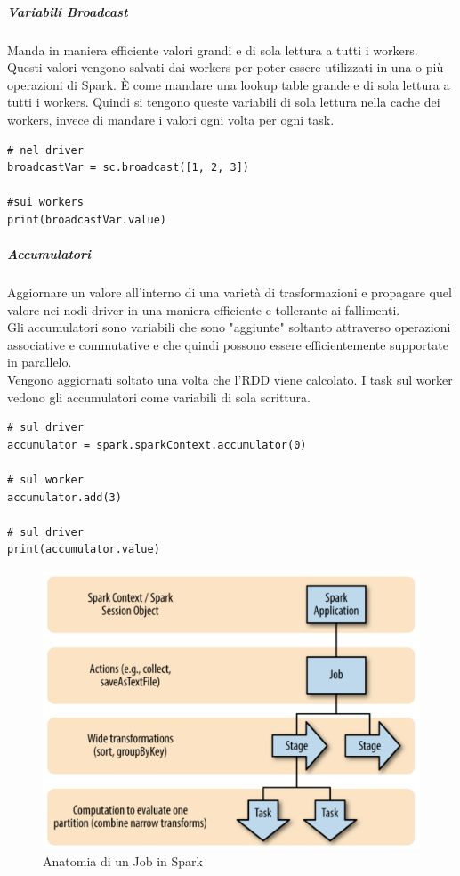 \documentclass{article}
\begin{document}
\begin{appendices}
\subparagraph{Variabili Broadcast}
Manda in maniera efficiente valori grandi e di sola lettura a tutti i workers. Questi valori vengono salvati dai workers per poter essere utilizzati in una o più operazioni di Spark. È come mandare una lookup table grande e di sola lettura a tutti i workers. Quindi si tengono queste variabili di sola lettura nella cache dei workers, invece di mandare i valori ogni volta per ogni task.
\begin{lstlisting}
# nel driver
broadcastVar = sc.broadcast([1, 2, 3])

#sui workers
print(broadcastVar.value)
\end{lstlisting}

\subparagraph{Accumulatori}
Aggiornare un valore all'interno di una varietà di trasformazioni e propagare quel valore nei nodi driver in una maniera efficiente e tollerante ai fallimenti. \\ 
Gli accumulatori sono variabili che sono "aggiunte" soltanto attraverso operazioni associative e commutative e che quindi possono essere efficientemente supportate in parallelo. \\ 
Vengono aggiornati soltato una volta che l'RDD viene calcolato. I task sul worker vedono gli accumulatori come variabili di sola scrittura.
\begin{lstlisting}
# sul driver
accumulator = spark.sparkContext.accumulator(0)

# sul worker
accumulator.add(3)

# sul driver
print(accumulator.value)
\end{lstlisting}

\begin{figure}[H]
    \centering
    \includegraphics[scale=0.3]{img/spark anatomia job.png}
    \caption{Anatomia di un Job in Spark}
\end{figure}\noindent


\end{appendices}
\end{document}
